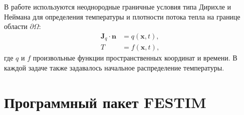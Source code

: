 В работе используются неоднородные граничные условия типа Дирихле и Неймана для определения температуры и плотности потока тепла на границе области \( \partial \Omega \):
\begin{subequations}
    \begin{align}
        \mathbf{J}_q \cdot \mathbf{n} & = q(\mathbf{x}, t) \label{eq:ch2/heat_bc_Neumann},  \\
        T                             & = f(\mathbf{x},t) \label{eq:ch2/heat_bc_Dirichlet},
    \end{align}
\end{subequations}
где \(q\) и \(f\) произвольные функции пространственных координат и времени. В каждой задаче также задавалось начальное распределение температуры.

\section{Программный пакет FESTIM}\label{sec:ch2/sec2}

